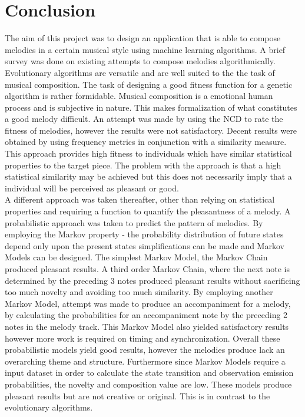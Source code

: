 \chapter{Conclusion}
The aim of this project was to design an application that is able to compose melodies in a certain musical style using machine learning algorithms. A brief survey was done on existing attempts to compose melodies algorithmically.
\\

Evolutionary algorithms are versatile and are well suited to the the task of musical composition. The task of designing a good fitness function for a genetic algorithm is rather formidable.
Musical composition is a emotional human process and is subjective in nature. This makes formalization of what constitutes a good melody difficult. 
An attempt was made by using the \ac{NCD} to rate the fitness of melodies, however the results were not satisfactory.
Decent results were obtained by using frequency metrics in conjunction with a similarity measure. This approach provides high fitness to individuals which have similar statistical properties to the target piece. The problem with the approach is that a high statistical similarity may be achieved but this does not necessarily imply that a individual will be perceived as pleasant or good.
\\

A different approach was taken thereafter, other than relying on statistical properties and requiring a function to quantify the pleasantness of a melody. A probabilistic approach was taken to predict the pattern of melodies. By employing the Markov property - the probability distribution of future states depend only upon the present states simplifications can be made and Markov Models can be designed. The simplest Markov Model, the Markov Chain produced pleasant results. A third order Markov Chain, where the next note is determined by the preceding 3 notes produced pleasant results without sacrificing too much novelty and avoiding too much similarity. By employing another Markov Model, attempt was made to produce an accompaniment for a melody, by calculating the probabilities for an accompaniment note by the preceding 2 notes in the melody track. This Markov Model also yielded satisfactory results however more work is required on timing and synchronization.
Overall these probabilistic models yield good results, however the melodies produce lack an overarching theme and structure. Furthermore since Markov Models require a input dataset in order to calculate the state transition and observation emission probabilities, the novelty and composition value are low. These models produce pleasant results but are not creative or original. This is in contrast to the evolutionary algorithms.
\\

